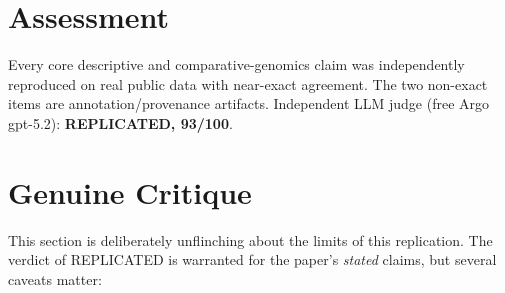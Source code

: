 \documentclass[11pt]{article}
\begin{document}
\section{Assessment}
Every core descriptive and comparative-genomics claim was independently
reproduced on real public data with near-exact agreement. The two non-exact
items are annotation/provenance artifacts. Independent LLM judge
(free Argo gpt-5.2): \textbf{REPLICATED, 93/100}.

\section{Genuine Critique}
This section is deliberately unflinching about the limits of this
replication. The verdict of REPLICATED is warranted for the paper's
\emph{stated} claims, but several caveats matter:
\end{document}
